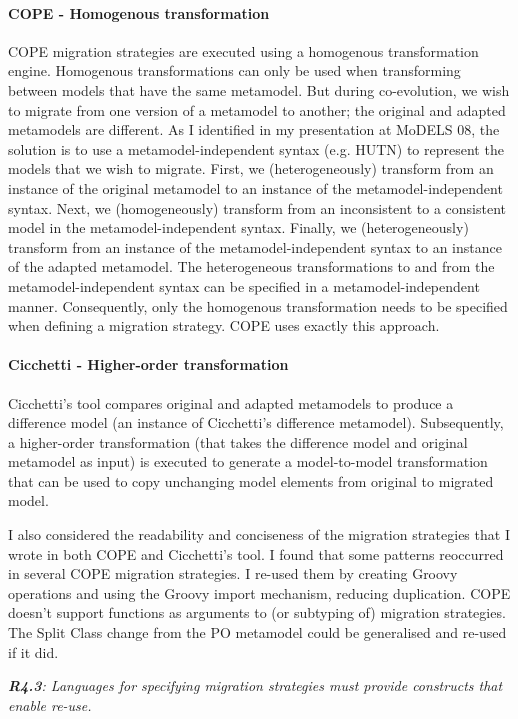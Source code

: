 \documentclass[a4paper]{article}
\begin{document}
\paragraph{COPE - Homogenous transformation} COPE migration strategies are executed using a homogenous transformation engine. Homogenous transformations can only be used when transforming between models that have the same metamodel. But during co-evolution, we wish to migrate from one version of a metamodel to another; the original and adapted metamodels are different. As I identified in my presentation at MoDELS 08, the solution is to use a metamodel-independent syntax (e.g. HUTN) to represent the models that we wish to migrate. First, we (heterogeneously) transform from an instance of the original metamodel to an instance of the metamodel-independent syntax. Next, we (homogeneously) transform from an inconsistent to a consistent model in the metamodel-independent syntax. Finally, we (heterogeneously) transform from an instance of the metamodel-independent syntax to an instance of the adapted metamodel. The heterogeneous transformations to and from the metamodel-independent syntax can be specified in a metamodel-independent manner. Consequently, only the homogenous transformation needs to be specified when defining a migration strategy. COPE uses exactly this approach.

\paragraph{Cicchetti - Higher-order transformation}
Cicchetti's tool compares original and adapted metamodels to produce a difference model (an instance of Cicchetti's difference metamodel). Subsequently, a higher-order transformation (that takes the difference model and original metamodel as input) is executed to generate a model-to-model transformation that can be used to copy unchanging model elements from original to migrated model.


I also considered the readability and conciseness of the migration strategies that I wrote in both COPE and Cicchetti's tool. I found that some patterns reoccurred in several COPE migration strategies. I re-used them by creating Groovy operations and using the Groovy import mechanism, reducing duplication. COPE doesn’t support functions as arguments to (or subtyping of) migration strategies. The Split Class change from the PO metamodel could be generalised and re-used if it did.

\emph{\textbf{R4.3}: Languages for specifying migration strategies must provide constructs that enable re-use.}
\end{document}
